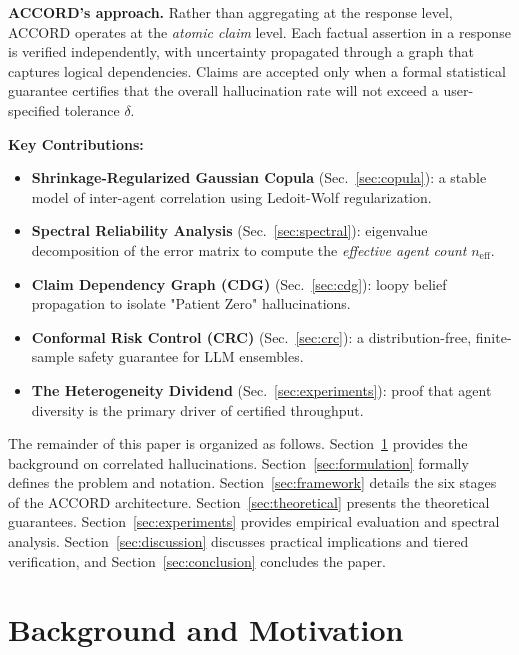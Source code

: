 \documentclass[conference]{IEEEtran}
\begin{document}
\textbf{ACCORD's approach.}
Rather than aggregating at the response level, ACCORD operates at the \emph{atomic claim} level. Each factual assertion in a response is verified independently, with uncertainty propagated through a graph that captures logical dependencies. Claims are accepted only when a formal statistical guarantee certifies that the overall hallucination rate will not exceed a user-specified tolerance $\delta$.

\noindent\textbf{Key Contributions:}
\begin{itemize}
  \item \textbf{Shrinkage-Regularized Gaussian Copula} (Sec.~\ref{sec:copula}): a stable model of inter-agent correlation using Ledoit-Wolf regularization.
  \item \textbf{Spectral Reliability Analysis} (Sec.~\ref{sec:spectral}): eigenvalue decomposition of the error matrix to compute the \emph{effective agent count} $n_\text{eff}$.
  \item \textbf{Claim Dependency Graph (CDG)} (Sec.~\ref{sec:cdg}): loopy belief propagation to isolate "Patient Zero" hallucinations.
  \item \textbf{Conformal Risk Control (CRC)} (Sec.~\ref{sec:crc}): a distribution-free, finite-sample safety guarantee for LLM ensembles.
  \item \textbf{The Heterogeneity Dividend} (Sec.~\ref{sec:experiments}): proof that agent diversity is the primary driver of certified throughput.
\end{itemize}

The remainder of this paper is organized as follows.
Section~\ref{sec:background} provides the background on correlated hallucinations.
Section~\ref{sec:formulation} formally defines the problem and notation.
Section~\ref{sec:framework} details the six stages of the ACCORD architecture.
Section~\ref{sec:theoretical} presents the theoretical guarantees.
Section~\ref{sec:experiments} provides empirical evaluation and spectral analysis.
Section~\ref{sec:discussion} discusses practical implications and tiered verification, and Section~\ref{sec:conclusion} concludes the paper.

\section{Background and Motivation}
\label{sec:background}
\end{document}
